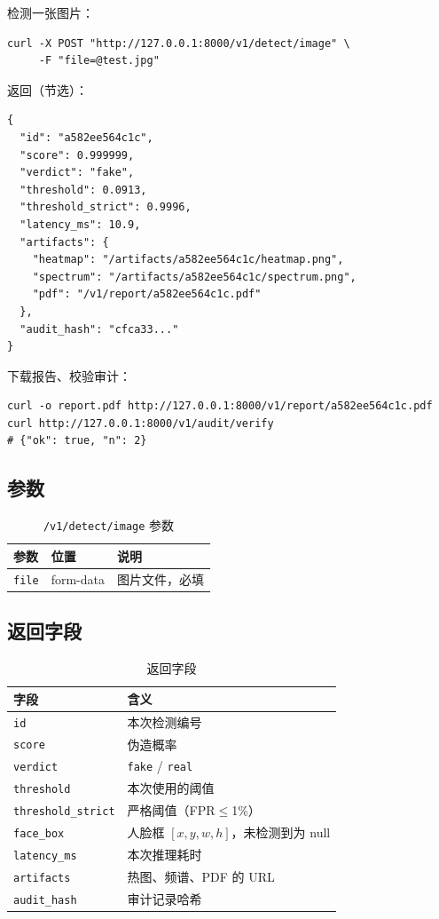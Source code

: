 \documentclass[12pt,a4paper]{article}
\begin{document}
检测一张图片：

\begin{lstlisting}
curl -X POST "http://127.0.0.1:8000/v1/detect/image" \
     -F "file=@test.jpg"
\end{lstlisting}

返回（节选）：

\begin{lstlisting}
{
  "id": "a582ee564c1c",
  "score": 0.999999,
  "verdict": "fake",
  "threshold": 0.0913,
  "threshold_strict": 0.9996,
  "latency_ms": 10.9,
  "artifacts": {
    "heatmap": "/artifacts/a582ee564c1c/heatmap.png",
    "spectrum": "/artifacts/a582ee564c1c/spectrum.png",
    "pdf": "/v1/report/a582ee564c1c.pdf"
  },
  "audit_hash": "cfca33..."
}
\end{lstlisting}

下载报告、校验审计：

\begin{lstlisting}
curl -o report.pdf http://127.0.0.1:8000/v1/report/a582ee564c1c.pdf
curl http://127.0.0.1:8000/v1/audit/verify
# {"ok": true, "n": 2}
\end{lstlisting}

\subsection{参数}

\begin{table}[H]
\centering
\caption{\texttt{/v1/detect/image} 参数}
\small
\begin{tabular}{lll}
\toprule
参数 & 位置 & 说明 \\
\midrule
\texttt{file} & form-data & 图片文件，必填 \\
\bottomrule
\end{tabular}
\end{table}

\subsection{返回字段}

\begin{table}[H]
\centering
\caption{返回字段}
\small
\begin{tabular}{p{3.4cm}p{10.4cm}}
\toprule
字段 & 含义 \\
\midrule
\texttt{id} & 本次检测编号 \\
\texttt{score} & 伪造概率 \\
\texttt{verdict} & \texttt{fake} / \texttt{real} \\
\texttt{threshold} & 本次使用的阈值 \\
\texttt{threshold\_strict} & 严格阈值（FPR$\le$1\%） \\
\texttt{face\_box} & 人脸框 $[x,y,w,h]$，未检测到为 null \\
\texttt{latency\_ms} & 本次推理耗时 \\
\texttt{artifacts} & 热图、频谱、PDF 的 URL \\
\texttt{audit\_hash} & 审计记录哈希 \\
\bottomrule
\end{tabular}
\end{table}
\end{document}
